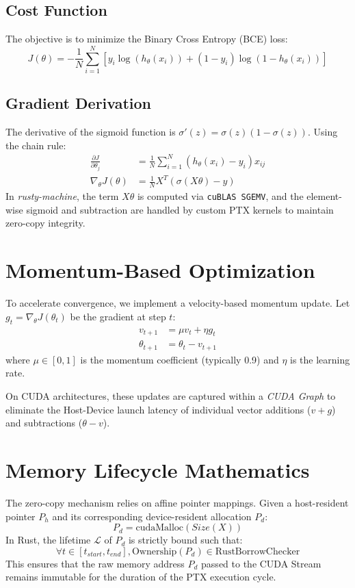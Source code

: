 \documentclass[conference]{IEEEtran}
\begin{document}
\subsection{Cost Function}
The objective is to minimize the Binary Cross Entropy (BCE) loss:
\begin{equation}
J(\theta) = -\frac{1}{N} \sum_{i=1}^N [y_i \log(h_\theta(x_i)) + (1-y_i) \log(1-h_\theta(x_i))]
\end{equation}

\subsection{Gradient Derivation}
The derivative of the sigmoid function is $\sigma'(z) = \sigma(z)(1-\sigma(z))$. Using the chain rule:
\begin{align}
\frac{\partial J}{\partial \theta_j} &= \frac{1}{N} \sum_{i=1}^N (h_\theta(x_i) - y_i)x_{ij} \\
\nabla_\theta J(\theta) &= \frac{1}{N} X^T (\sigma(X\theta) - y)
\end{align}
In \textit{rusty-machine}, the term $X\theta$ is computed via \texttt{cuBLAS SGEMV}, and the element-wise sigmoid and subtraction are handled by custom PTX kernels to maintain zero-copy integrity.

\section{Momentum-Based Optimization}
To accelerate convergence, we implement a velocity-based momentum update. Let $g_t = \nabla_\theta J(\theta_t)$ be the gradient at step $t$:
\begin{align}
v_{t+1} &= \mu v_t + \eta g_t \\
\theta_{t+1} &= \theta_t - v_{t+1}
\end{align}
where $\mu \in [0, 1]$ is the momentum coefficient (typically 0.9) and $\eta$ is the learning rate.

On CUDA architectures, these updates are captured within a \textit{CUDA Graph} to eliminate the Host-Device launch latency of individual vector additions ($v + g$) and subtractions ($\theta - v$).

\section{Memory Lifecycle Mathematics}
The zero-copy mechanism relies on affine pointer mappings. Given a host-resident pointer $P_h$ and its corresponding device-resident allocation $P_d$:
\begin{equation}
P_d = \text{cudaMalloc}(Size(X))
\end{equation}
In Rust, the lifetime $\mathcal{L}$ of $P_d$ is strictly bound such that:
\begin{equation}
\forall t \in [t_{start}, t_{end}], \text{Ownership}(P_d) \in \text{RustBorrowChecker}
\end{equation}
This ensures that the raw memory address $P_d$ passed to the CUDA Stream remains immutable for the duration of the PTX execution cycle.
\end{document}
